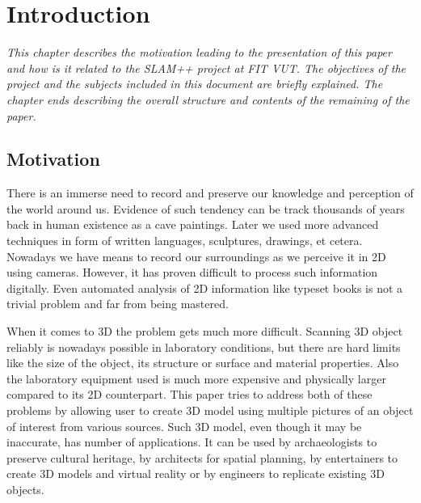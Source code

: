 
\chapter{Introduction}
\textit{This chapter describes the motivation leading to the presentation of this paper and how is it related to the SLAM++ project at FIT VUT. The objectives of the project and the subjects included in this document are briefly explained. The chapter ends describing the overall structure and contents of the remaining of the paper.}

\section{Motivation}
There is an immerse need to record and preserve our knowledge and perception of the world around us. Evidence of such tendency can be track thousands of years back in human existence as a cave paintings. Later we used more advanced techniques in form of written languages, sculptures, drawings, et cetera. Nowadays we have means to record our surroundings as we perceive it in 2D using cameras. However, it has proven difficult to process such information digitally. Even automated analysis of 2D information like typeset books is not a trivial problem and far from being mastered.

When it comes to 3D the problem gets much more difficult. Scanning 3D object reliably is nowadays possible in laboratory conditions, but there are hard limits like the size of the object, its structure or surface and material properties. Also the laboratory equipment used is much more expensive and physically larger compared to its 2D counterpart. This paper tries to address both of these problems by allowing user to create 3D model using multiple pictures of an object of interest from various sources. Such 3D model, even though it may be inaccurate, has number of applications. It can be used by archaeologists to preserve cultural heritage, by architects for spatial planning, by entertainers to create 3D models and virtual reality or by engineers to replicate existing 3D objects.

